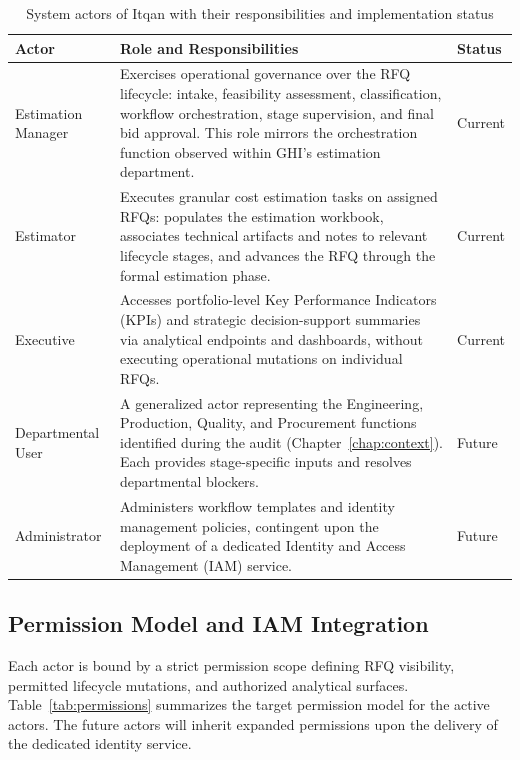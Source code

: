 \begin{table}[H]
\centering
\renewcommand{\arraystretch}{1.4}
\begin{tabularx}{\textwidth}{|p{2.9cm}|>{\RaggedRight\arraybackslash}X|p{1.8cm}|}
\hline
\rowcolor{lightgray}
\textbf{Actor} & \textbf{Role and Responsibilities} & \textbf{Status} \\ \hline
Estimation Manager & Exercises operational governance over the RFQ lifecycle: intake, feasibility assessment, classification, workflow orchestration, stage supervision, and final bid approval. This role mirrors the orchestration function observed within GHI's estimation department. & Current \\ \hline
Estimator & Executes granular cost estimation tasks on assigned RFQs: populates the estimation workbook, associates technical artifacts and notes to relevant lifecycle stages, and advances the RFQ through the formal estimation phase. & Current \\ \hline
Executive & Accesses portfolio-level Key Performance Indicators (KPIs) and strategic decision-support summaries via analytical endpoints and dashboards, without executing operational mutations on individual RFQs. & Current \\ \hline
Departmental User & A generalized actor representing the Engineering, Production, Quality, and Procurement functions identified during the audit (Chapter~\ref{chap:context}). Each provides stage-specific inputs and resolves departmental blockers. & Future \\ \hline
Administrator & Administers workflow templates and identity management policies, contingent upon the deployment of a dedicated Identity and Access Management (IAM) service. & Future \\ \hline
\end{tabularx}
\caption{System actors of Itqan with their responsibilities and implementation status}
\label{tab:actors}
\end{table}

\subsection{Permission Model and IAM Integration}
Each actor is bound by a strict permission scope defining RFQ visibility, permitted lifecycle mutations, and authorized analytical surfaces. Table~\ref{tab:permissions} summarizes the target permission model for the active actors. The future actors will inherit expanded permissions upon the delivery of the dedicated identity service.

